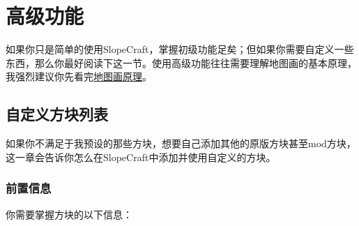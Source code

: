 \documentclass{article}
\begin{document}
   \pagebreak
   \section{高级功能}
   如果你只是简单的使用SlopeCraft，掌握初级功能足矣；但如果你需要自定义一些东西，那么你最好阅读下这一节。使用高级功能往往需要理解地图画的基本原理，我强烈建议你先看完\href{https://github.com/ToKiNoBug/SlopeCraftTutorial/blob/main/BasicPrinciple/Principle%20of%20map%20pixel%20arts.md}{地图画原理}。

   \subsection{自定义方块列表}
   如果你不满足于我预设的那些方块，想要自己添加其他的原版方块甚至mod方块，这一章会告诉你怎么在SlopeCraft中添加并使用自定义的方块。
   
   \subsubsection{前置信息}
   你需要掌握方块的以下信息：
\end{document}
